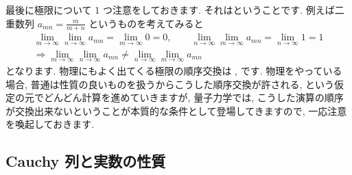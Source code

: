 \documentclass[openany, a4paper, oneside]{jsbook}
\begin{document}
最後に極限について 1 つ注意をしておきます.
それはということです.
例えば二重数列 $a_{mn}=\frac{m}{m+n}$ というものを考えてみると
\begin{gather}
    \lim_{m\to\infty} \lim_{n\to\infty}a_{mn}
    =
    \lim_{m\to\infty}0
    =
    0,
    \qquad
    \lim_{n\to\infty} \lim_{m\to\infty}a_{mn}
    =
    \lim_{n\to\infty}1
    =1\\
    \Longrightarrow
    \lim_{m\to\infty} \lim_{n\to\infty}a_{mn}
    \not=
    \lim_{n\to\infty} \lim_{m\to\infty}a_{mn}
\end{gather}
となります. 物理にもよく出てくる極限の順序交換は
, です.
物理をやっている場合, 普通は性質の良いものを扱うからこうした順序交換が許される, という仮定の元でどんどん計算を進めていきますが,
量子力学では, こうした演算の順序が交換出来ないということが本質的な条件として登場してきますので, 一応注意を喚起しておきます.
\subsection{Cauchy 列と実数の性質}
\end{document}
